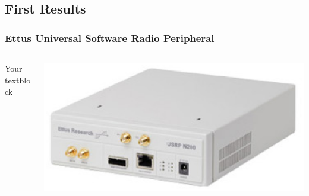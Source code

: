 \documentclass{beamer}
\begin{document}
\subsection{First Results}

\begin{frame}
\frametitle{Ettus Universal Software Radio Peripheral}
  \begin{columns}[T]
    \begin{column}{.5\textwidth}
     \begin{block}{Your textblock}
    \end{block}
    \end{column}
    \begin{column}{.5\textwidth}
    \begin{block}{}
    \includegraphics[width=\textwidth]{n200.eps}
    \end{block}
    \end{column}
  \end{columns}
\end{frame}
\end{document}

